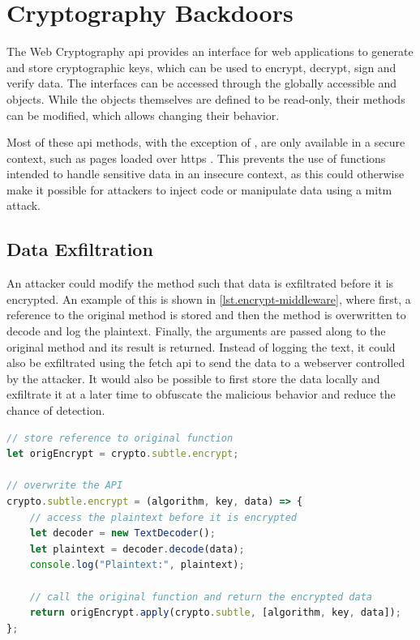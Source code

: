 \section{Cryptography Backdoors}
\label{sec.threats.crypto}

The Web Cryptography \acs{api} provides an interface for web applications to generate and store cryptographic keys, which can be used to encrypt, decrypt, sign and verify data. The interfaces can be accessed through the globally accessible  and  objects. While the objects themselves are defined to be read-only, their methods can be modified, which allows changing their behavior. \cite{crypto}

Most of these \acs{api} methods, with the exception of , are only available in a secure context, such as pages loaded over \acs{https} \cite{crypto}. This prevents the use of functions intended to handle sensitive data in an insecure context, as this could otherwise make it possible for attackers to inject code or manipulate data using a \ac{mitm} attack.



\subsection{Data Exfiltration}
\label{sec.threats.crypto.plaintext}

An attacker could modify the  method such that data is exfiltrated before it is encrypted. An example of this is shown in \autoref{lst.encrypt-middleware}, where first, a reference to the original method is stored and then the method is overwritten to decode and log the plaintext. Finally, the arguments are passed along to the original method and its result is returned. Instead of logging the text, it could also be exfiltrated using the fetch \acs{api} to send the data to a webserver controlled by the attacker. It would also be possible to first store the data locally and exfiltrate it at a later time to obfuscate the malicious behavior and reduce the chance of detection.

\begin{lstlisting}[language=JavaScript,label={lst.encrypt-middleware},caption={Interception of data before it is encrypted}]
// store reference to original function
let origEncrypt = crypto.subtle.encrypt;

// overwrite the API
crypto.subtle.encrypt = (algorithm, key, data) => {
    // access the plaintext before it is encrypted
    let decoder = new TextDecoder();
    let plaintext = decoder.decode(data);
    console.log("Plaintext:", plaintext);

    // call the original function and return the encrypted data
    return origEncrypt.apply(crypto.subtle, [algorithm, key, data]);
};
\end{lstlisting}



